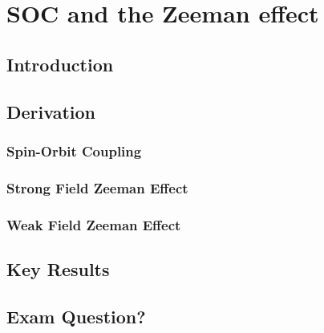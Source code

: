 \chapter{SOC and the Zeeman effect}
\label{chapt4}

\section{Introduction}

\section{Derivation}


\subsection{Spin-Orbit Coupling}



\subsection{Strong Field Zeeman Effect}




\subsection{Weak Field Zeeman Effect}




\section{Key Results}





\section{Exam Question?}



